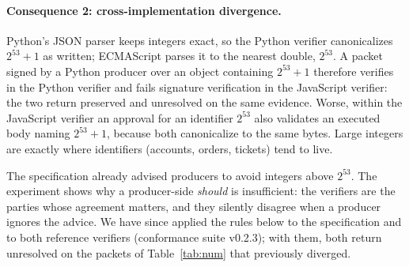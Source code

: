 \documentclass[11pt,a4paper]{article}
\theoremstyle{definition}
\theoremstyle{remark}
\newcommand{\pres}{\textsf{preserved}}
\newcommand{\unres}{\textsf{unresolved}}
\begin{document}
\paragraph{Consequence 2: cross-implementation divergence.} Python's JSON parser keeps integers exact, so the Python verifier canonicalizes $2^{53}+1$ as written; ECMAScript parses it to the nearest double, $2^{53}$. A packet signed by a Python producer over an object containing $2^{53}+1$ therefore verifies in the Python verifier and fails signature verification in the JavaScript verifier: the two return \pres{} and \unres{} on the same evidence. Worse, within the JavaScript verifier an approval for an identifier $2^{53}$ also validates an executed body naming $2^{53}+1$, because both canonicalize to the same bytes. Large integers are exactly where identifiers (accounts, orders, tickets) tend to live.

The specification already advised producers to avoid integers above $2^{53}$. The experiment shows why a producer-side \emph{should} is insufficient: the verifiers are the parties whose agreement matters, and they silently disagree when a producer ignores the advice. We have since applied the rules below to the specification and to both reference verifiers (conformance suite v0.2.3); with them, both return \unres{} on the packets of Table~\ref{tab:num} that previously diverged.
\end{document}
